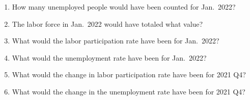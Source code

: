 \documentclass[
    letterpaper,paper=portrait,fleqn,
    DIV=16,fontsize=12pt,twoside=semi,
    parskip=full-,
    headings=standardclasses]
{scrartcl}
\begin{document}
\begin{enumerate}
\begin{enumerate}
\item How many unemployed people would have been counted for Jan.~2022?

\vfill

\item The labor force in Jan.~2022 would have totaled what value?

\vfill

\item What would the labor participation rate have been for Jan.~2022?

\vfill

\item What would the unemployment rate have been for Jan.~2022?

\vfill

\item What would the change in labor participation rate have been for 2021 Q4?

\vfill

\item What would the change in the unemployment rate have been for 2021 Q4?

\vfill
\vspace{-2\baselineskip}

\end{enumerate}
\end{enumerate}
\end{document}
